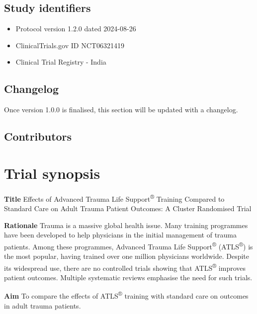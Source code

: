 \documentclass[
]{scrartcl}
\providecommand{\tightlist}{%
  \setlength{\itemsep}{0pt}\setlength{\parskip}{0pt}}\usepackage{longtable,booktabs,array}
\begin{document}
\hypertarget{study-identifiers}{%
\subsection{Study identifiers}\label{study-identifiers}}

\begin{itemize}
\tightlist
\item
  Protocol version 1.2.0 dated 2024-08-26
\item
  ClinicalTrials.gov ID NCT06321419
\item
  Clinical Trial Registry - India
\end{itemize}

\hypertarget{changelog}{%
\subsection{Changelog}\label{changelog}}

Once version 1.0.0 is finalised, this section will be updated with a
changelog.

\hypertarget{contributors}{%
\subsection{Contributors}\label{contributors}}

\newpage{}

\hypertarget{trial-synopsis}{%
\section{Trial synopsis}\label{trial-synopsis}}

\textbf{Title} Effects of Advanced Trauma Life
Support\textsuperscript{®} Training Compared to Standard Care on Adult
Trauma Patient Outcomes: A Cluster Randomised Trial

\textbf{Rationale} Trauma is a massive global health issue. Many
training programmes have been developed to help physicians in the
initial management of trauma patients. Among these programmes, Advanced
Trauma Life Support\textsuperscript{®} (ATLS\textsuperscript{®}) is the
most popular, having trained over one million physicians worldwide.
Despite its widespread use, there are no controlled trials showing that
ATLS\textsuperscript{®} improves patient outcomes. Multiple systematic
reviews emphasise the need for such trials.

\textbf{Aim} To compare the effects of ATLS\textsuperscript{®} training
with standard care on outcomes in adult trauma patients.
\end{document}
